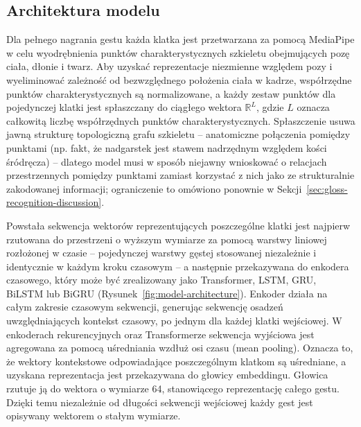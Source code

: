 \subsection{Architektura modelu}
\label{sec:gloss-recognition-model}

Dla pełnego nagrania gestu każda klatka jest przetwarzana za pomocą MediaPipe
w celu wyodrębnienia punktów charakterystycznych szkieletu obejmujących pozę
ciała, dłonie i twarz. Aby uzyskać reprezentacje niezmienne względem pozy
i wyeliminować zależność od bezwzględnego położenia ciała w kadrze, współrzędne
punktów charakterystycznych są normalizowane, a każdy zestaw punktów dla
pojedynczej klatki jest spłaszczany do ciągłego wektora $\mathbb{R}^L$, gdzie
$L$ oznacza całkowitą liczbę współrzędnych punktów charakterystycznych.
Spłaszczenie usuwa jawną strukturę topologiczną grafu szkieletu -- anatomiczne
połączenia pomiędzy punktami (np. fakt, że nadgarstek jest stawem nadrzędnym
względem kości śródręcza) -- dlatego model musi w sposób niejawny wnioskować
o relacjach przestrzennych pomiędzy punktami zamiast korzystać z nich jako
ze strukturalnie zakodowanej informacji; ograniczenie to omówiono ponownie
w Sekcji~\ref{sec:gloss-recognition-discussion}.

Powstała sekwencja wektorów reprezentujących poszczególne klatki jest najpierw
rzutowana do przestrzeni o wyższym wymiarze za pomocą warstwy liniowej
rozłożonej w czasie -- pojedynczej warstwy gęstej stosowanej niezależnie
i identycznie w każdym kroku czasowym -- a następnie przekazywana do enkodera
czasowego, który może być zrealizowany jako Transformer, LSTM, GRU, BiLSTM
lub BiGRU (Rysunek~\ref{fig:model-architecture}). Enkoder działa na całym
zakresie czasowym sekwencji, generując sekwencję osadzeń uwzględniających
kontekst czasowy, po jednym dla każdej klatki wejściowej.
W enkoderach rekurencyjnych oraz Transformerze sekwencja wyjściowa jest
agregowana za pomocą uśredniania wzdłuż osi czasu (mean pooling). Oznacza
to, że wektory kontekstowe odpowiadające poszczególnym klatkom są uśredniane,
a uzyskana reprezentacja jest przekazywana do głowicy embeddingu. Głowica
rzutuje ją do wektora o wymiarze 64, stanowiącego reprezentację całego gestu.
Dzięki temu niezależnie od długości sekwencji wejściowej każdy gest jest
opisywany wektorem o stałym wymiarze.


